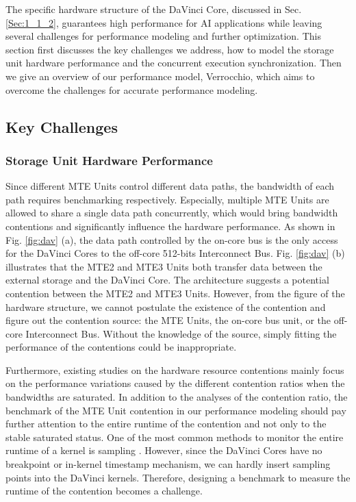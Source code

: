 \documentclass[12pt]{extbook}
\begin{document}
The specific hardware structure of the DaVinci Core, discussed in Sec. \ref{Sec:1_1_2}, guarantees high performance for AI applications while leaving several challenges for performance modeling and further optimization. This section first discusses the key challenges we address, how to model the storage unit hardware performance and the concurrent execution synchronization. Then we give an overview of our performance model, Verrocchio, which aims to overcome the challenges for accurate performance modeling.

\subsection{Key Challenges}

\subsubsection{Storage Unit Hardware Performance}

Since different MTE Units control different data paths, the bandwidth of each path requires benchmarking respectively. Especially, multiple MTE Units are allowed to share a single data path concurrently, which would bring bandwidth contentions and significantly influence the hardware performance. As shown in Fig. \ref{fig:dav} (a), the data path controlled by the on-core bus is the only access for the DaVinci Cores to the off-core 512-bits Interconnect Bus. Fig. \ref{fig:dav} (b) illustrates that the MTE2 and MTE3 Units both transfer data between the external storage and the DaVinci Core. The architecture suggests a potential contention between the MTE2 and MTE3 Units. However, from the figure of the hardware structure, we cannot postulate the existence of the contention and figure out the contention source: the MTE Units, the on-core bus unit, or the off-core Interconnect Bus. Without the knowledge of the source, simply fitting the performance of the contentions could be inappropriate.

Furthermore, existing studies on the hardware resource contentions \cite{DBLP:conf/sc/HristeaLK97, DBLP:conf/usenix/SrikanthanDS15} mainly focus on the performance variations caused by the different contention ratios when the bandwidths are saturated. In addition to the analyses of the contention ratio, the benchmark of the MTE Unit contention in our performance modeling should pay further attention to the entire runtime of the contention and not only to the stable saturated status. One of the most common methods to monitor the entire runtime of a kernel is sampling \cite{IBM_profiler, Del_profiler, Goo_profiler}. However, since the DaVinci Cores have no breakpoint or in-kernel timestamp mechanism, we can hardly insert sampling points into the DaVinci kernels. Therefore, designing a benchmark to measure the runtime of the contention becomes a challenge.
\end{document}

